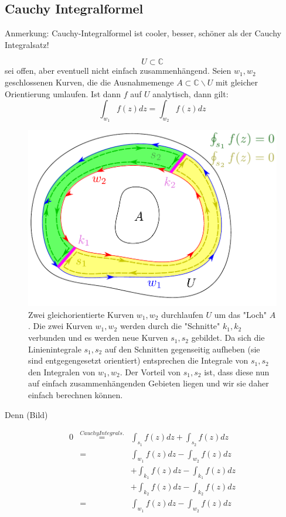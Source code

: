 \documentclass[10pt,a4paper]{article}
\begin{document}
\subsection{Cauchy Integralformel}
Anmerkung:
Cauchy-Integralformel ist cooler, besser, schöner als der Cauchy Integralsatz!

\begin{satz}
$$U \subset \mathbb{C}$$ sei offen, aber eventuell nicht einfach zusammenhängend. Seien $w_1,w_2$ geschlossenen Kurven, die die Ausnahmemenge $A \subset \mathbb{C} \backslash U$ mit gleicher Orientierung umlaufen. Ist dann $f$ auf $U$ analytisch, dann gilt: $$\int_{w_1} f(z) dz = \int_{w_2} f(z) dz$$

\begin{figure}[H]
\includegraphics[width=\textwidth]{images/umlauf03}
\caption{Zwei gleichorientierte Kurven $w_1,w_2$ durchlaufen $U$ um das "Loch" $A$. Die zwei Kurven $w_1,w_2$ werden durch die "Schnitte" $k_1,k_2$ verbunden und es werden neue Kurven $s_1,s_2$ gebildet. Da sich die Linienintegrale $s_1,s_2$ auf den Schnitten gegenseitig aufheben (sie sind entgegengesetzt orientiert) entsprechen die Integrale von $s_1,s_2$ den Integralen von $w_1,w_2$. Der Vorteil von $s_1,s_2$ ist, dass diese nun auf einfach zusammenhängenden Gebieten liegen und wir sie daher einfach berechnen können.}
\end{figure}

Denn (Bild) 


\begin{eqnarray*}
0 &\stackrel{Cauchy Integrals.}{=}& \int_{s_1} f(z) dz + \int_{s_2} f(z) dz \\
&=& \int_{w_1} f(z) dz - \int_{w_2} f(z) dz \\
& & + \int_{k_1} f(z) dz - \int_{k_1} f(z) dz  \\
& & + \int_{k_2} f(z) dz - \int_{k_2} f(z) dz \\
&=& \int_{w_1} f(z) dz - \int_{w_2} f(z) dz
\end{eqnarray*}

\end{satz}
\end{document}

